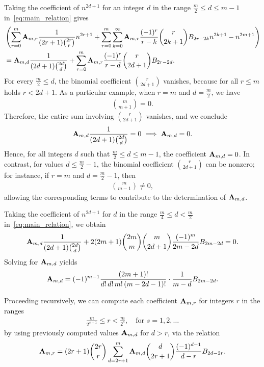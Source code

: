 Taking the coefficient of $n^{2d+1}$ for an integer $d$ in the range $\frac{m}{2} \leq d \leq m-1$ in~\eqref{eq:main_relation} gives
\begin{align*}
[n^{2d+1}]
    &\left( \sum_{r=0}^{m} \coeffA{m}{r} \frac{1}{(2r+1) \binom{2r}{r}} n^{2r+1} + \sum_{r=0}^{m} \sum_{k=0}^{\infty} \coeffA{m}{r} \frac{(-1)^r}{r-k} \binom{r}{2k+1} \bernoulli{2r-2k} n^{2k+1} - n^{2m+1} \right) \\
    &= \coeffA{m}{d} \frac{1}{(2d+1) \binom{2d}{d}} + \sum_{r=0}^m \coeffA{m}{r} \frac{(-1)^r}{r-d} \binom{r}{2d+1} \bernoulli{2r-2d}.
\end{align*}
For every $\frac{m}{2} \leq d$, the binomial coefficient $\binom{r}{2d+1}$ vanishes, because for all $r \leq m$
holds $r < 2d+1$.
As a particular example, when $r = m$ and $d = \frac{m}{2}$, we have
\begin{align*}
    \binom{m}{m+1} = 0.
\end{align*}
Therefore, the entire sum involving $\binom{r}{2d+1}$ vanishes, and we conclude
\begin{align*}
    {\mathbf{A}} \sb{m,d} \frac{1}{(2d+1) \binom{2d}{d}} = 0 \implies {\mathbf{A}} \sb{m,d} = 0.
\end{align*}
Hence, for all integers $d$ such that $\frac{m}{2} \leq d \leq m-1$, the coefficient ${\mathbf{A}} \sb{m,d} = 0$.
In contrast, for values $d \leq \frac{m}{2} - 1$, the binomial coefficient $\binom{r}{2d+1}$ can be nonzero; for instance, if $r = m$ and $d = \frac{m}{2} - 1$, then
\begin{align*}
    \binom{m}{m - 1} \neq 0,
\end{align*}
allowing the corresponding terms to contribute to the determination of ${\mathbf{A}} \sb{m,d}$.

Taking the coefficient of $n^{2d+1}$ for $d$ in the range $\frac{m}{4} \leq d < \frac{m}{2}$ in~\eqref{eq:main_relation}, we obtain
\begin{align*}
    {\mathbf{A}} \sb{m,d} \frac{1}{(2d+1) \binom{2d}{d}}
    + 2 (2m+1) \binom{2m}{m} \binom{m}{2d+1} \frac{(-1)^m}{2m - 2d} {B}\sb{2m - 2d} = 0.
\end{align*}
Solving for ${\mathbf{A}} \sb{m,d}$ yields
\begin{equation*}
    {\mathbf{A}} \sb{m,d}
    = (-1)^{m-1} \frac{(2m+1)!}{d! \, d! \, m! \, (m - 2d - 1)!} \cdot \frac{1}{m - d} {B}\sb{2m - 2d}.
\end{equation*}

Proceeding recursively, we can compute each coefficient ${\mathbf{A}} \sb{m,r}$ for integers $r$ in the ranges
\begin{align*}
    \frac{m}{2^{s+1}} \leq r < \frac{m}{2^s}, \quad \text{for } s = 1, 2, \ldots
\end{align*}
by using previously computed values ${\mathbf{A}} \sb{m,d}$ for $d > r$, via the relation
\begin{equation*}
    {\mathbf{A}} \sb{m,r} =
    (2r+1) \binom{2r}{r} \sum_{d = 2r+1}^{m}
    {\mathbf{A}} \sb{m,d} \binom{d}{2r+1} \frac{(-1)^{d-1}}{d - r} {B}\sb{2d - 2r}.
\end{equation*}

